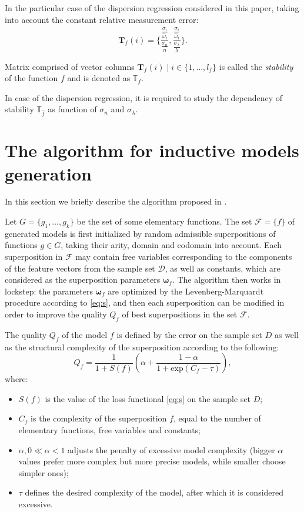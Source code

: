 \documentclass[11pt,a4paper]{article}
\theoremstyle{definition}
\begin{document}
In the particular case of the dispersion regression considered in this paper, taking into account
the constant relative measurement error:
\[
  \mathbf{T}_f(i) = \Big\{ \frac{\frac{\overline{\sigma}_i}{\hat{\omega}_i}}{\frac{\sigma_n}{n}}, \frac{\frac{\overline{\sigma}_i}{\hat{\omega}_i}}{\frac{\sigma_{\lambda}}{\lambda}} \Big\}.
\]

Matrix comprised of vector columns $\mathbf{T}_f(i) \mid i \in \{ 1, \dots, l_f \}$
is called the \emph{stability} of the function $f$ and is denoted as $\mathbb{T}_f$.

In case of the dispersion regression, it is required to study the dependency of stability
$\mathbb{T}_{\hat{f}}$ as function of $\sigma_n$ and $\sigma_{\lambda}$.

\section{The algorithm for inductive models generation}

In this section we briefly describe the algorithm proposed in \cite{Rudoy13}.

Let $G = \{ g_1, \dots, g_k \}$ be the set of some elementary functions.
The set $\mathcal{F} = \{ f \}$ of generated models is first initialized
by random admissible superpositions of functions $g \in G$, taking their
arity, domain and codomain into account. Each superposition in $\mathcal{F}$
may contain free variables corresponding to the components of the feature
vectors from the sample set $\mathcal{D}$, as well as constants, which are
considered as the superposition parameters $\boldsymbol{\omega}_f$.
The algorithm then works in lockstep: the parameters $\boldsymbol{\omega}_f$
are optimized by the Levenberg-Marquardt procedure according to
\eqref{eq:s}, and then each superposition can be modified
in order to improve the quality $Q_f$ of best superpositions
in the set $\mathcal{F}$.

The quality $Q_f$ of the model $f$ is defined by the error on the sample
set $D$ as well as the structural complexity of the superposition according to the
following:
\begin{equation}
  Q_f = \frac{1}{1 + S(f)} \left(\alpha + \frac{1 - \alpha}{1 + \text{exp} (C_f - \tau)}\right),
  \label{eq:s_f}
\end{equation}
where:
\begin{itemize}
  \item[] $S(f)$ is the value of the loss functional \eqref{eq:s} on the sample set $D$;
  \item[] $C_f$ is the complexity of the superposition $f$, equal to the number of
	elementary functions, free variables and constants;
  \item[] $\alpha, 0 \ll \alpha < 1$ adjusts the penalty of excessive model complexity
	(bigger $\alpha$ values prefer more complex but more precise models, while smaller
	choose simpler ones);
  \item[] $\tau$ defines the desired complexity of the model, after which it is considered
	excessive.
\end{itemize}
\end{document}
